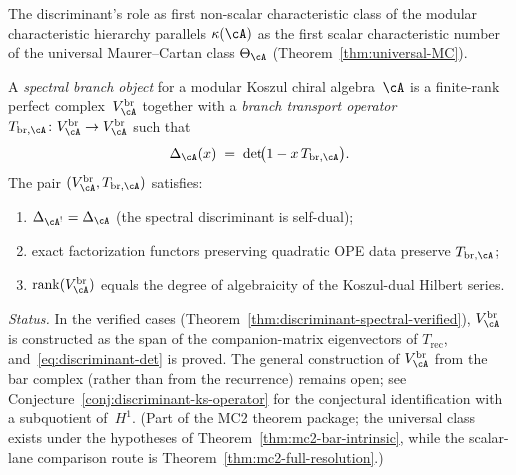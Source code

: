 \begin{remark}
The discriminant's role as first non-scalar characteristic class
of the modular characteristic hierarchy parallels $\kappa(\cA)$ as the first
scalar characteristic number of the universal Maurer--Cartan
class $\Theta_{\cA}$ (Theorem~\ref{thm:universal-MC}).
\end{remark}

\begin{definition}
\label{def:spectral-branch-object}
A \emph{spectral branch object} for a modular Koszul chiral
algebra~$\cA$ is a finite-rank perfect complex~$V_{\cA}^{\mathrm{br}}$
together with a \emph{branch transport operator}
$T_{\mathrm{br},\cA} \colon V_{\cA}^{\mathrm{br}} \to
V_{\cA}^{\mathrm{br}}$ such that
\begin{equation}\label{eq:discriminant-det}
\Delta_{\cA}(x)
\;=\;
\det\!\bigl(1 - x\, T_{\mathrm{br},\cA}\bigr).
\end{equation}
The pair $(V_{\cA}^{\mathrm{br}}, T_{\mathrm{br},\cA})$ satisfies:
\begin{enumerate}[label=\textup{(\roman*)}]
\item $\Delta_{\cA^!} = \Delta_{\cA}$
 (the spectral discriminant is self-dual);
\item exact factorization functors preserving quadratic OPE data
 preserve $T_{\mathrm{br},\cA}$;
\item $\operatorname{rank}(V_{\cA}^{\mathrm{br}})$
 equals the degree of algebraicity of the Koszul-dual
 Hilbert series.
\end{enumerate}

\smallskip\noindent
\emph{Status.}
In the verified cases (Theorem~\ref{thm:discriminant-spectral-verified}),
$V_{\cA}^{\mathrm{br}}$ is constructed as the span of the
companion-matrix eigenvectors of $T_{\mathrm{rec}}$,
and~\eqref{eq:discriminant-det} is proved. The general
construction of $V_{\cA}^{\mathrm{br}}$ from the bar complex
(rather than from the recurrence) remains open; see
Conjecture~\ref{conj:discriminant-ks-operator} for the
conjectural identification with a subquotient of~$H^1$.
(Part of the MC2 theorem package; the universal class exists under
the hypotheses of Theorem~\ref{thm:mc2-bar-intrinsic}, while the scalar-lane
comparison route is Theorem~\ref{thm:mc2-full-resolution}.)
\end{definition}

